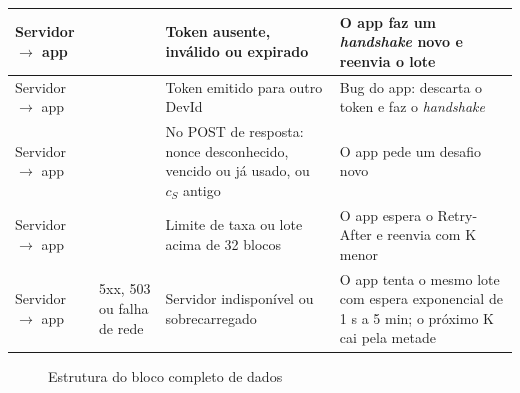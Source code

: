 \documentclass[
	12pt,
	article,			%
	oneside,
	a4paper,
	english,
	brazil				%
	]{abntex2}
\begin{document}
\begin{longtable}{|>{\raggedright\arraybackslash}p{}|>{\raggedright\arraybackslash}p{}|>{\raggedright\arraybackslash}p{}|>{\raggedright\arraybackslash}p{}|}
	\hline
	Servidor $\rightarrow$ app & 401 & Token ausente, inválido ou expirado & O app faz um \textit{handshake} novo e reenvia o lote \\
	\hline
	Servidor $\rightarrow$ app & 403 & Token emitido para outro DevId & Bug do app: descarta o token e faz o \textit{handshake} \\
	\hline
	Servidor $\rightarrow$ app & 409 & No POST de resposta: nonce desconhecido, vencido ou já usado, ou $c_S$ antigo & O app pede um desafio novo \\
	\hline
	Servidor $\rightarrow$ app & 429 & Limite de taxa ou lote acima de 32 blocos & O app espera o Retry-After e reenvia com K menor \\
	\hline
	Servidor $\rightarrow$ app & 5xx, 503 ou falha de rede & Servidor indisponível ou sobrecarregado & O app tenta o mesmo lote com espera exponencial de 1 s a 5 min; o próximo K cai pela metade \\
\end{longtable}

\begin{figure}[H]
	\centering
	\caption{Estrutura do bloco completo de dados}
	\label{fig:bloco-completo}
\end{figure}
\end{document}
